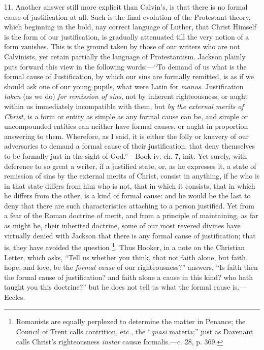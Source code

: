 11. Another answer still more explicit than Calvin's, is that there
is no formal cause of justification at all. Such is the final
evolution of the Protestant theory, which beginning in the bold, nay
correct language of Luther, that Christ Himself is the form of our
justification, is gradually attenuated till the very notion of a form
vanishes. This is the ground taken by those of our writers who are not
Calvinists, yet retain partially the language of Protestantism.
Jackson plainly puts forward this view in the following words:—``To
demand of us what is the formal cause of Justification, by which our
sins are formally remitted, is as if we should ask one of our young
pupils, what were Latin for \emph{manus}. Justification \emph{taken}
(as we do) \emph{for remission of sins}, not by inherent
righteousness, or aught within us immediately incompatible with
them, but \emph{by the external merits of Christ}, is a form or entity
as simple as any formal cause can be, and simple or uncompounded
entities can neither have formal causes, or aught in proportion
answering to them. Wherefore, as I said, it is either the folly or
knavery of our adversaries to demand a formal cause of their
justification, that deny themselves to be formally just in the sight
of God.''—Book iv. ch. 7, init. Yet surely, with deference to so
great a writer, if a justified state, or, as he expresses it, a state
of remission of sins by the external merits of Christ, consist in
anything, if he who is in that state differs from him who is not, that
in which it consists, that in which he differs from the other, is a
kind of formal cause: and he would be the last to deny that there are
such characteristics attaching to a person justified. Yet from a fear
of the Roman doctrine of merit, and from a principle of maintaining,
as far as might be, their inherited doctrine, some of our most revered
divines have virtually denied with Jackson that there is any formal
cause of justification; that is, they have avoided the question \footnote{Romanists are
equally perplexed to determine the matter in Penance; the Council of
Trent calls contrition, etc., the ``\emph{quasi} materia;'' just
as Davenant calls Christ's righteousness \emph{instar} causæ formalis.—c.
28, p. 369.}. Thus Hooker, in a note on the Christian Letter, which asks,
``Tell us whether you think, that not faith alone, but faith,
hope, and love, be the \emph{formal cause} of our righteousness?''
answers, ``Is faith then the formal cause of justification? and
faith alone a cause in this kind? who hath taught you this
doctrine?'' but he does not tell us what the formal cause is.—Eccles.
